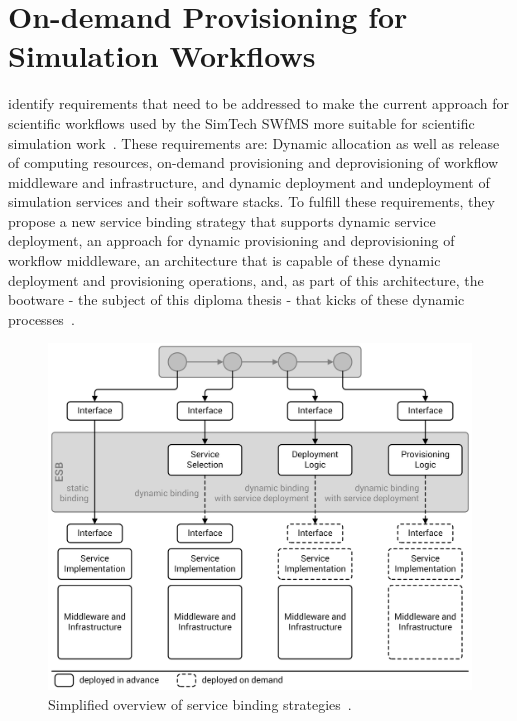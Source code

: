 \section{On-demand Provisioning for Simulation Workflows}
\label{previous:ondemand}

\citeauthor*{provisioning:ondemand} identify requirements that need to be addressed to make the current approach for scientific workflows used by the SimTech SWfMS more suitable for scientific simulation work~\autocite{provisioning:ondemand}.
These requirements are: Dynamic allocation as well as release of computing resources, on-demand provisioning and deprovisioning of workflow middleware and infrastructure, and dynamic deployment and undeployment of simulation services and their software stacks.
To fulfill these requirements, they propose a new service binding strategy that supports dynamic service deployment, an approach for dynamic provisioning and deprovisioning of workflow middleware, an architecture that is capable of these dynamic deployment and provisioning operations, and, as part of this architecture, the bootware - the subject of this diploma thesis - that kicks of these dynamic processes~\autocite{provisioning:ondemand}.

\begin{figure}[!htbp]
	\centering
	\includegraphics[resolution=600]{previous/assets/service_binding_strategies}
	\caption{Simplified overview of service binding strategies~\autocite[based on][]{provisioning:ondemand}.}
	\label{image:service_binding_strategies}
\end{figure}


